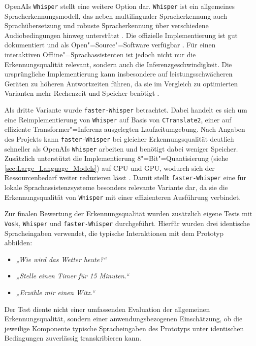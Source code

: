 OpenAIs \texttt{Whisper} \autocite{Whisper-Documentation} stellt eine weitere Option dar. \texttt{Whisper} ist ein allgemeines Spracherkennungsmodell, das neben multilingualer Spracherkennung auch Sprachübersetzung und robuste Spracherkennung über verschiedene Audiobedingungen hinweg unterstützt \autocite{robustSpeechRecognition}. Die offizielle Implementierung ist gut dokumentiert und als Open"=Source"=Software verfügbar \autocite{Whisper-Documentation}. Für einen interaktiven Offline"=Sprachassistenten ist jedoch nicht nur die Erkennungsqualität relevant, sondern auch die Inferenzgeschwindigkeit. Die ursprüngliche Implementierung kann insbesondere auf leistungsschwächeren Geräten zu höheren Antwortzeiten führen, da sie im Vergleich zu optimierten Varianten mehr Rechenzeit und Speicher benötigt \autocite{FasterWhisper-Documentation}.

Als dritte Variante wurde \texttt{faster-Whisper} \autocite{FasterWhisper-Documentation} betrachtet. Dabei handelt es sich um eine Reimplementierung von \texttt{Whisper} auf Basis von \texttt{CTranslate2}, einer auf effiziente Transformer"=Inferenz ausgelegten Laufzeitumgebung. Nach Angaben des Projekts kann \texttt{faster-Whisper} bei gleicher Erkennungsqualität deutlich schneller als OpenAIs \texttt{Whisper} arbeiten und benötigt dabei weniger Speicher. Zusätzlich unterstützt die Implementierung 8"=Bit"=Quantisierung (siehe \autoref{sec:Large_Language_Models}) auf CPU und GPU, wodurch sich der Ressourcenbedarf weiter reduzieren lässt \autocite{FasterWhisper-Documentation}. Damit stellt \texttt{faster-Whisper} eine für lokale Sprachassistenzsysteme besonders relevante Variante dar, da sie die Erkennungsqualität von \texttt{Whisper} mit einer effizienteren Ausführung verbindet.

Zur finalen Bewertung der Erkennungsqualität wurden zusätzlich eigene Tests mit \texttt{Vosk}, \texttt{Whisper} und \texttt{faster-Whisper} durchgeführt. Hierfür wurden drei identische Spracheingaben verwendet, die typische Interaktionen mit dem Prototyp abbilden:

\begin{itemize}
  \item \textit{„Wie wird das Wetter heute?“}
  \item \textit{„Stelle einen Timer für 15 Minuten.“}
  \item \textit{„Erzähle mir einen Witz.“}
\end{itemize}

Der Test diente nicht einer umfassenden Evaluation der allgemeinen Erkennungsqualität, sondern einer anwendungsbezogenen Einschätzung, ob die jeweilige Komponente typische Spracheingaben des Prototyps unter identischen Bedingungen zuverlässig transkribieren kann.

